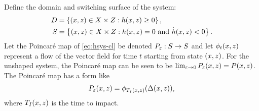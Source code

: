 \documentclass[twocolumn]{article}
\begin{document}
Define the domain and switching surface of the system:
\begin{align}
  D &= \left\{ (x, z) \in X \times Z : h(x, z) \geq 0 \right\},\\
  \nonumber
  S &= \left\{ (x, z) \in X \times Z : h(x, z) = 0 \mbox{ and } {\dot h}(x, z) < 0 \right\}.
\end{align}
Let the Poincar{\'e} map of \eqref{eq:hsys-cl} be denoted $P_{\varepsilon} : S \to S$ and let $\phi_{t}(x, z)$ represent a flow of the vector field for time $t$ starting from state $(x, z)$.
%
For the unshaped system, the Poincar{\'e} map can be seen to be $\lim_{\varepsilon \to 0} P_{\varepsilon}(x, z) = P(x, z)$.
%
The Poincar{\'e} map has a form like
\begin{align}
  P_{\varepsilon}(x, z) = \phi_{T_{I}(x, z)}(\Delta(x, z)),
\end{align}
where $T_{I}(x, z)$ is the time to impact.
\end{document}
